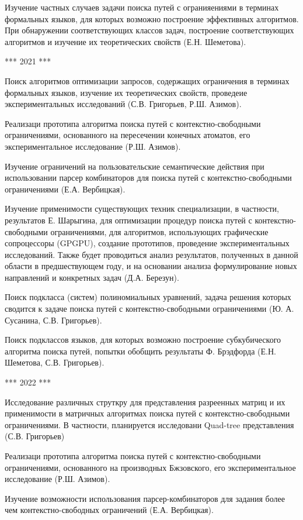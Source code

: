 \documentclass[12pt]{article}  %
\theoremstyle{remark}
\begin{document}
Изучение частных случаев задачи поиска путей с огранияениями в терминах формальных языков, для которых возможно построение эффективных алгоритмов. При обнаружении соответствующих классов задач, построение соответствующих алгоритмов и изучение их теоретических свойств (Е.Н. Шеметова).


*** 2021 ***

Поиск алгоритмов оптимизации запросов, содержащих ограничения в терминах формальных языков, изучение их теоретических свойств, проведеие экспериментальных исследований (С.В. Григорьев, Р.Ш. Азимов).

Реализаци прототипа алгоритма поиска путей с контекстно-свободными ограничениями, основанного на пересечении конечных атоматов, его экспериментальное исследование (Р.Ш. Азимов).

Изучение ограничений на пользовательские семантические действия при использовании парсер комбинаторов для поиска путей с контекстно-свободными ограничениями (Е.А. Вербицкая).

Изучение применимости существующих техник специализации, в частности, результатов Е. Шарыгина, для оптимизации процедур поиска путей с контекстно-свободными ограничениями, для алгоритмов, использующих графические сопроцессоры (GPGPU), создание прототипов, проведение экспериментальных исследований. Также будет проводиться анализ результатов, полученных в данной области в предшествующем году, и на основании анализа формулирование новых направлений и конкретных задач (Д.А. Березун).

Поиск подкласса (систем) полиномиальных уравнений, задача решения которых сводится к задаче поиска путей с контекстно-свободными ограничениями (Ю. А. Сусанина, С.В. Григорьев).

Поиск подклассов языков, для которых возможно построение субкубического алгоритма поиска путей, попытки обобщить результаты Ф. Брэдфорда (Е.Н. Шеметова, С.В. Григорьев).


*** 2022 ***

Исследование различных струткру для представления разреенных матриц и их применимости в матричных алгоритмах поиска путей с контекстно-свободными ограничениями. В частности, планируется исследовани Quad-tree представления (С.В. Григорьев)

Реализаци прототипа алгоритма поиска путей с контекстно-свободными ограничениями, основанного на производных Бжзовского, его экспериментальное исследование (Р.Ш. Азимов).

Изучение возможности использования парсер-комбинаторов для задания более чем контекстно-свободных ограничений (Е.А. Вербицкая).
\end{document}
